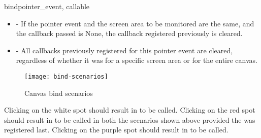 \begin{methoddesc}[Canvas]{bind}{pointer_event, callable}
\begin{itemize}
\item {} - If the pointer
event and the screen area to be monitored are the same, and the callback passed
is None, the callback registered previously is cleared.

\item {} - All callbacks previously registered
for this pointer event are cleared, regardless of whether it was for a specific
screen area or for the entire canvas.
\end{itemize}

\begin{figure}
\centering
\texttt{[image: bind-scenarios]}
\caption{Canvas bind scenarios}
\label{fig:bind-scenarios}
\end{figure}

Clicking on the white spot should result in  to be called. 
Clicking on the red spot should result in  to be called in both
the scenarios shown above provided the  was registered last. 
Clicking on the purple spot should result in  to be called.

\end{methoddesc}

